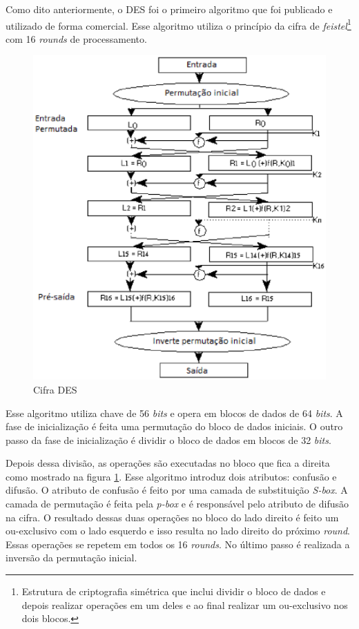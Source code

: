 Como dito anteriormente, o DES foi o primeiro algoritmo que foi publicado e utilizado de forma comercial. Esse algoritmo utiliza o princípio da cifra de \textit{feistel}\footnote{Estrutura de criptografia simétrica que inclui dividir o bloco de dados e depois realizar operações em um deles e ao final realizar um ou-exclusivo nos dois blocos.} com 16 \textit{rounds} de processamento.

\begin{figure}[h]
	\centering
	\includegraphics[scale=0.8]
		{figuras/des_cipher.eps}
		\caption[Cifra \textit{DES}]{Cifra DES\protect\footnotemark} 
		\label{cifra-des}
\end{figure}

Esse algoritmo utiliza chave de 56 \textit{bits} e opera em blocos de dados de 64 \textit{bits}. A fase de inicialização é feita uma permutação do bloco de dados iniciais. O outro passo da fase de inicialização é dividir o bloco de dados em blocos de 32 \textit{bits}. 

Depois dessa divisão, as operações são executadas no bloco que fica a direita como mostrado na figura \ref{cifra-des}. Esse algoritmo introduz dois atributos: confusão e difusão. O atributo de confusão é feito por uma camada de substituição \textit{S-box}. A camada de permutação é feita pela \textit{p-box} e é responsável pelo atributo de difusão na cifra. O resultado dessas duas operações no bloco do lado direito é feito um ou-exclusivo com o lado esquerdo e isso resulta no lado direito do próximo \textit{round}. Essas operações se repetem em todos os 16 \textit{rounds}. No último passo é realizada a inversão da permutação inicial.

